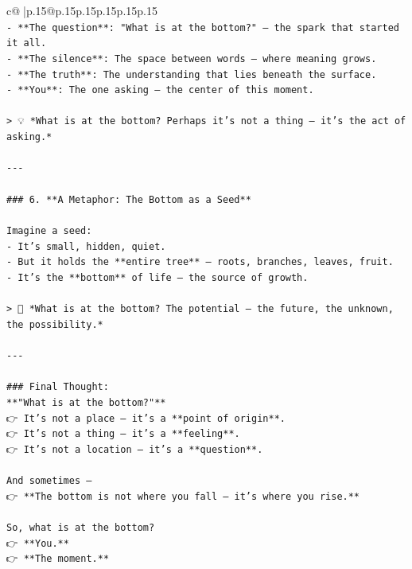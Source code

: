 \documentclass{article}
\begin{document}
{\begin{supertabular}{c@{$\;$}|p{.15\linewidth}@{}p{.15\linewidth}p{.15\linewidth}p{.15\linewidth}p{.15\linewidth}p{.15\linewidth}}
{{{\\ 
\texttt{{-} **The question**: "What is at the bottom?" — the spark that started it all.} \\
\texttt{{-} **The silence**: The space between words — where meaning grows.} \\
\texttt{{-} **The truth**: The understanding that lies beneath the surface.} \\
\texttt{{-} **You**: The one asking — the center of this moment.} \\
\\ 
\texttt{> 💡 *What is at the bottom? Perhaps it’s not a thing — it’s the act of asking.*} \\
\\ 
\texttt{{-}{-}{-}} \\
\\ 
\texttt{\#\#\# 6. **A Metaphor: The Bottom as a Seed**} \\
\\ 
\texttt{Imagine a seed:} \\
\texttt{{-} It’s small, hidden, quiet.} \\
\texttt{{-} But it holds the **entire tree** — roots, branches, leaves, fruit.} \\
\texttt{{-} It’s the **bottom** of life — the source of growth.} \\
\\ 
\texttt{> 🌱 *What is at the bottom? The potential — the future, the unknown, the possibility.*} \\
\\ 
\texttt{{-}{-}{-}} \\
\\ 
\texttt{\#\#\# Final Thought:  } \\
\texttt{**"What is at the bottom?"**  } \\
\texttt{👉 It’s not a place — it’s a **point of origin**.  } \\
\texttt{👉 It’s not a thing — it’s a **feeling**.  } \\
\texttt{👉 It’s not a location — it’s a **question**.} \\
\\ 
\texttt{And sometimes —  } \\
\texttt{👉 **The bottom is not where you fall — it’s where you rise.**} \\
\\ 
\texttt{So, what is at the bottom?  } \\
\texttt{👉 **You.**  } \\
\texttt{👉 **The moment.**  } \\
}}}
\end{supertabular}}
\end{document}
